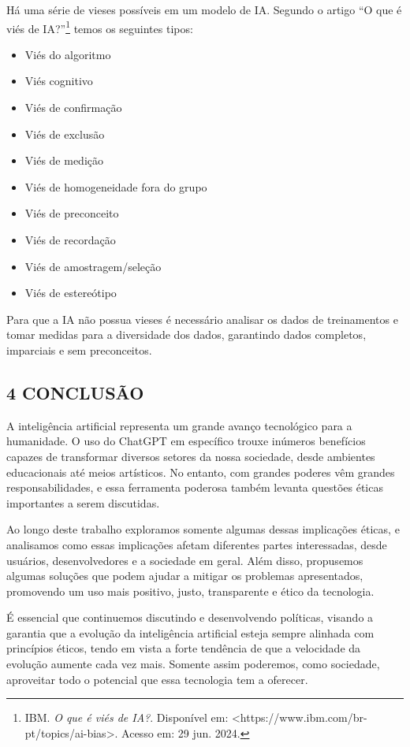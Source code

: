 Há uma série de vieses possíveis em um modelo de IA. Segundo o artigo “O que é viés de IA?”\footnote{IBM. \textit{O que é viés de IA?}. Disponível em: <https://www.ibm.com/br-pt/topics/ai-bias>. Acesso em: 29 jun. 2024.} temos os seguintes tipos:

\begin{itemize}
\item Viés do algoritmo
\item Viés cognitivo
\item Viés de confirmação
\item Viés de exclusão
\item Viés de medição
\item Viés de homogeneidade fora do grupo
\item Viés de preconceito
\item Viés de recordação
\item Viés de amostragem/seleção
\item Viés de estereótipo 
\end{itemize}

Para que a IA não possua vieses é necessário analisar os dados de treinamentos e tomar medidas para a diversidade dos dados, garantindo dados completos, imparciais e sem preconceitos. 


\subsection*{\textbf{4 CONCLUSÃO}}
A inteligência artificial representa um grande avanço tecnológico para a humanidade. O uso do ChatGPT em específico trouxe inúmeros benefícios capazes de transformar diversos setores da nossa sociedade, desde ambientes educacionais até meios artísticos. No entanto, com grandes poderes vêm grandes responsabilidades, e essa ferramenta poderosa também levanta questões éticas importantes a serem discutidas.

Ao longo deste trabalho exploramos somente algumas dessas implicações éticas, e analisamos como essas implicações afetam diferentes partes interessadas, desde usuários, desenvolvedores e a sociedade em geral. Além disso, propusemos algumas soluções que podem ajudar a mitigar os problemas apresentados, promovendo um uso mais positivo, justo, transparente e ético da tecnologia.

É essencial que continuemos discutindo e desenvolvendo políticas, visando a garantia que a evolução da inteligência artificial esteja sempre alinhada com princípios éticos, tendo em vista a forte tendência de que a velocidade da evolução aumente cada vez mais. Somente assim poderemos, como sociedade, aproveitar todo o potencial que essa tecnologia tem a oferecer.